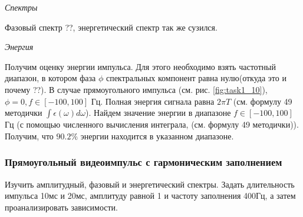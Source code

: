 \textit{Спектры}

Фазовый спектр ??, энергетический спектр так же сузился.

\textit{Энергия}

Получим оценку энергии импульса. Для этого необходимо взять частотный диапазон, в котором фаза $\phi$ спектральных компонент
равна нулю(откуда это и почему ??). В случае прямоугольного импульса (см. рис. \ref{fig:task1_10}), $\phi=0, f \in [-100,
100]$ Гц. 
Полная энергия сигнала равна $2 \pi T$ (см. формулу 49 методички $\int \epsilon(\omega) d\omega$). Найдем значение
энергии в диапазоне $f \in [-100, 100]$ Гц (с помощью численного вычисления интеграла, (см. формулу 49 методички)).
Получим, что $90.2 \%$ энергии находится в указанном диапазоне.


\subsubsection{Прямоугольный видеоимпульс с гармоническим заполнением}
Изучить амплитудный, фазовый и энергетический спектры. Задать
длительность импульса 10мс и 20мс, амплитуду равной 1 и частоту
заполнения 400Гц, а затем проанализировать зависимости.

